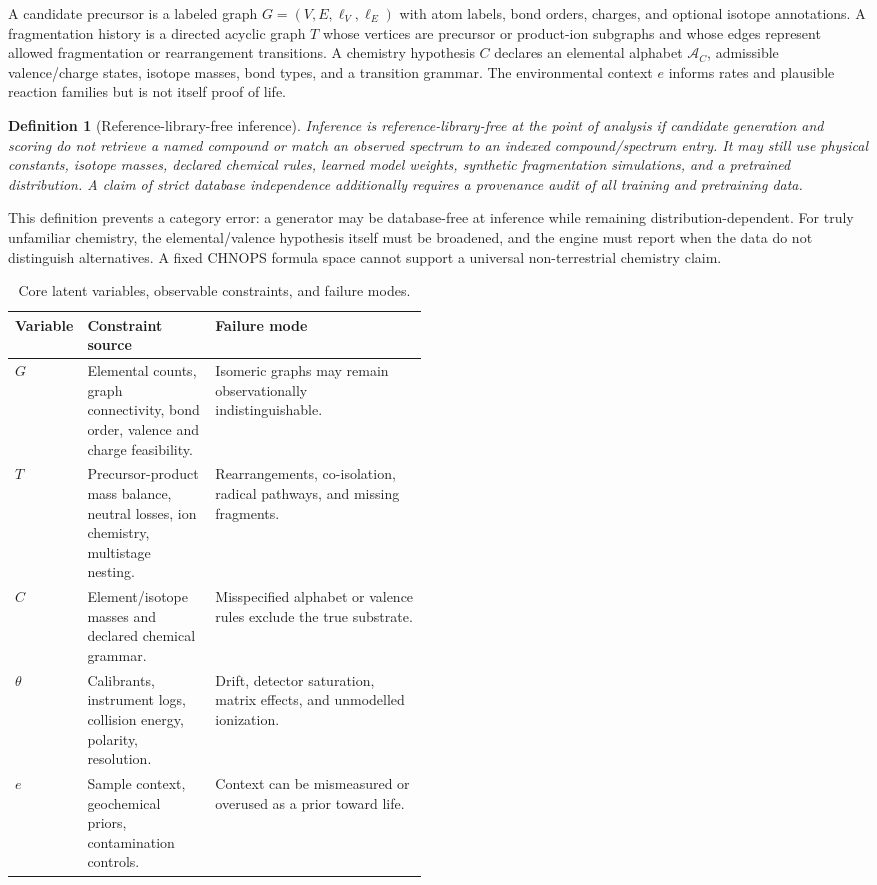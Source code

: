 \documentclass[10pt,a4paper]{article}
\newtheorem{definition}{Definition}
\begin{document}
A candidate precursor is a labeled graph $G=(V,E,\ell_V,\ell_E)$ with atom labels, bond orders, charges, and optional isotope annotations. A fragmentation history is a directed acyclic graph $T$ whose vertices are precursor or product-ion subgraphs and whose edges represent allowed fragmentation or rearrangement transitions. A chemistry hypothesis $C$ declares an elemental alphabet $\mathcal{A}_C$, admissible valence/charge states, isotope masses, bond types, and a transition grammar. The environmental context $e$ informs rates and plausible reaction families but is not itself proof of life.

\begin{definition}[Reference-library-free inference]
Inference is reference-library-free at the point of analysis if candidate generation and scoring do not retrieve a named compound or match an observed spectrum to an indexed compound/spectrum entry. It may still use physical constants, isotope masses, declared chemical rules, learned model weights, synthetic fragmentation simulations, and a pretrained distribution. A claim of strict database independence additionally requires a provenance audit of all training and pretraining data.
\end{definition}

This definition prevents a category error: a generator may be database-free at inference while remaining distribution-dependent. For truly unfamiliar chemistry, the elemental/valence hypothesis itself must be broadened, and the engine must report when the data do not distinguish alternatives. A fixed CHNOPS formula space cannot support a universal non-terrestrial chemistry claim.

\begin{table}[H]
\centering\small
\caption{Core latent variables, observable constraints, and failure modes.}
\label{tab:variables}
\begin{tabularx}{\linewidth}{p{0.17\linewidth}p{0.31\linewidth}X}
\toprule
Variable & Constraint source & Failure mode \\
\midrule
$G$ & Elemental counts, graph connectivity, bond order, valence and charge feasibility. & Isomeric graphs may remain observationally indistinguishable. \\
$T$ & Precursor-product mass balance, neutral losses, ion chemistry, multistage nesting. & Rearrangements, co-isolation, radical pathways, and missing fragments. \\
$C$ & Element/isotope masses and declared chemical grammar. & Misspecified alphabet or valence rules exclude the true substrate. \\
$\theta$ & Calibrants, instrument logs, collision energy, polarity, resolution. & Drift, detector saturation, matrix effects, and unmodelled ionization. \\
$e$ & Sample context, geochemical priors, contamination controls. & Context can be mismeasured or overused as a prior toward life. \\
\bottomrule
\end{tabularx}
\end{table}
\end{document}
